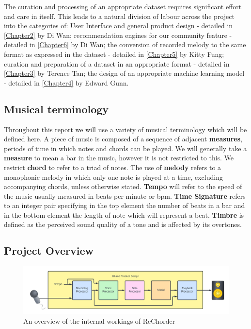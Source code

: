 The curation and processing of an appropriate dataset requires significant effort and care in itself.
This leads to a natural division of labour across the project into the categories of:\label{sec:Introduction}
User Interface and general product design - detailed in \cref{Chapter2} by Di Wan;
recommendation engines for our community feature - detailed in \cref{Chapter6} by Di Wan;
the conversion of recorded melody to the same format as expressed in the dataset - detailed in \cref{Chapter5} by Kitty Fung;
curation and preparation of a dataset in an appropriate format - detailed in \cref{Chapter3} by Terence Tan;
the design of an appropriate machine learning model - detailed in \cref{Chapter4} by Edward Gunn.



\subsection{Musical terminology}
Throughout this report we will use a variety of musical terminology which will be defined here. A piece of music is composed of a sequence of adjacent \textbf{measures}, periods of time in which notes and chords can be played. 
We will generally take a \textbf{measure} to mean a bar in the music, however it is not restricted to this. We restrict \textbf{chord} to refer to a triad of notes. %
The use of \textbf{melody} refers to a monophonic melody in which only one note is played at a time, excluding accompanying chords, unless otherwise stated.
\textbf{Tempo} will refer to the speed of the music usually measured in beats per minute or bpm.
\textbf{Time Signature} refers to an integer pair specifying in the top element the number of beats in a bar and in the bottom element the length of note which will represent a beat.
\textbf{Timbre} is defined as the perceived sound quality of a tone and is affected by its overtones.

\subsection{Project Overview}
\label{Project Overview}
\begin{figure}
    \centering
    \includegraphics[width=0.8\columnwidth]{Figures/Project Overview}
    \decoRule
    \caption[]{An overview of the internal workings of ReChorder}
    \label{fig:MVPOverview}
\end{figure}

